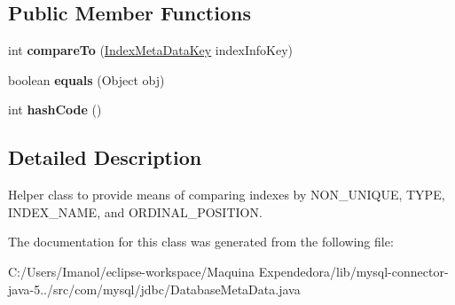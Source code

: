 \subsection*{Public Member Functions}
\begin{DoxyCompactItemize}
\item 
\mbox{\label{classcom_1_1mysql_1_1jdbc_1_1_database_meta_data_1_1_index_meta_data_key_afbde6bd538db98b888315aad111b6652}} 
int {\bfseries compare\+To} (\mbox{\hyperlink{classcom_1_1mysql_1_1jdbc_1_1_database_meta_data_1_1_index_meta_data_key}{Index\+Meta\+Data\+Key}} index\+Info\+Key)
\item 
\mbox{\label{classcom_1_1mysql_1_1jdbc_1_1_database_meta_data_1_1_index_meta_data_key_a1694c4b08df64f88b348c8062defce08}} 
boolean {\bfseries equals} (Object obj)
\item 
\mbox{\label{classcom_1_1mysql_1_1jdbc_1_1_database_meta_data_1_1_index_meta_data_key_a74a4921a5434e534bf08e4880e31af13}} 
int {\bfseries hash\+Code} ()
\end{DoxyCompactItemize}


\subsection{Detailed Description}
Helper class to provide means of comparing indexes by N\+O\+N\+\_\+\+U\+N\+I\+Q\+UE, T\+Y\+PE, I\+N\+D\+E\+X\+\_\+\+N\+A\+ME, and O\+R\+D\+I\+N\+A\+L\+\_\+\+P\+O\+S\+I\+T\+I\+ON. 

The documentation for this class was generated from the following file\+:\begin{DoxyCompactItemize}
\item 
C\+:/\+Users/\+Imanol/eclipse-\/workspace/\+Maquina Expendedora/lib/mysql-\/connector-\/java-\/5../src/com/mysql/jdbc/Database\+Meta\+Data.\+java\end{DoxyCompactItemize}
